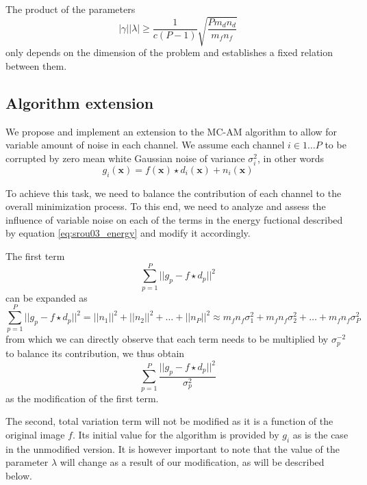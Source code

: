 \documentclass[12pt,notitlepage]{report}
\begin{document}
The product of the parameters 
\begin{equation}
\label{eq:srou03_lambda_estimate}
	|\gamma| |\lambda| \geq \frac{1}{c(P-1)} \sqrt{\frac{P m_d n_d}{m_f n_f}}
\end{equation}
only depends on the dimension of the problem and establishes a fixed relation between them.


\subsection{Algorithm extension}
\label{sec:srou03_extension}
We propose and implement an extension to the MC-AM algorithm to allow for variable amount of noise in each channel. We assume each channel $i \in {1 \dots P}$ to be corrupted by zero mean white Gaussian noise of variance $\sigma_i^2$, in other words
\begin{equation}
\label{eq:srou03_general_model_ext}
	g_i(\mathbf{x}) = f(\mathbf{x}) \star d_i(\mathbf{x}) + n_i(\mathbf{x}) 	
\end{equation}

To achieve this task, we need to balance the contribution of each channel to the overall minimization process. To this end, we need to analyze and assess the influence of variable noise on each of the terms in the energy fuctional described by equation \ref{eq:srou03_energy} and modify it accordingly. 

The first term  
\begin{equation}
\label{eq:srou03_term_1_ext}
	\sum_{p=1}^{P} || g_p - f \star d_p ||^2 	
\end{equation}
can be expanded as 
\begin{equation}
\label{eq:srou03_term_1_ext_exp}
	\sum_{p=1}^{P} || g_p - f \star d_p ||^2 = ||n_1||^2 + ||n_2||^2 + \dots + ||n_P||^2 \approx m_f n_f \sigma_1^2 + m_f n_f \sigma_2^2 + \dots + m_f n_f \sigma_P^2 	
\end{equation}
from which we can directly observe that each term needs to be multiplied by $\sigma_p^{-2}$ to balance its contribution, we thus obtain
\begin{equation}
\label{eq:srou03_term_1_ext}
	\sum_{p=1}^{P} \frac{|| g_p - f \star d_p ||^2}{\sigma_p^2} 	
\end{equation}
as the modification of the first term.

The second, total variation term will not be modified as it is a function of the original image $f$. Its initial value for the algorithm is provided by $g_i$ as is the case in the unmodified version.
It is however important to note that the value of the parameter $\lambda$ will change as a result of our modification, as will be described below. 
\end{document}
